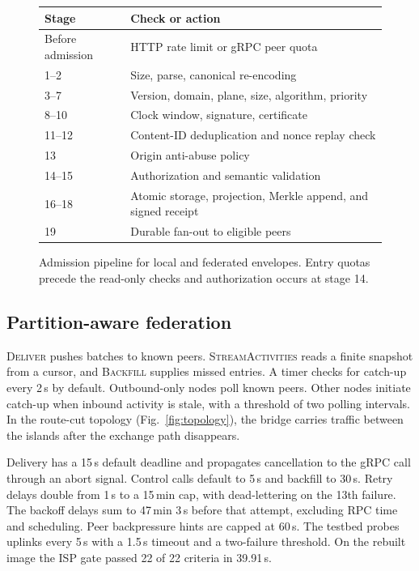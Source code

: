 \documentclass[conference,a4paper,10pt]{IEEEtran}
\begin{document}
\begin{figure}[!t]
  \centering
  {\footnotesize
  \begin{tabularx}{\columnwidth}{@{}lX@{}}
    \toprule
    \textbf{Stage} & \textbf{Check or action} \\
    \midrule
    Before admission & HTTP rate limit or gRPC peer quota \\
    \midrule
    1--2 & Size, parse, canonical re-encoding \\
    3--7 & Version, domain, plane, size, algorithm, priority \\
    8--10 & Clock window, signature, certificate \\
    11--12 & Content-ID deduplication and nonce replay check \\
    \midrule
    13 & Origin anti-abuse policy \\
    14--15 & Authorization and semantic validation \\
    16--18 & Atomic storage, projection, Merkle append, and signed receipt \\
    19 & Durable fan-out to eligible peers \\
    \bottomrule
  \end{tabularx}}
  \caption{Admission pipeline for local and federated envelopes. Entry quotas precede the read-only checks and authorization occurs at stage 14.}
  \label{fig:pipeline}
\end{figure}

\subsection{Partition-aware federation}

\textsc{Deliver} pushes batches to known peers. \textsc{StreamActivities} reads a finite snapshot from a cursor, and \textsc{Backfill} supplies missed entries. A timer checks for catch-up every 2\,s by default. Outbound-only nodes poll known peers. Other nodes initiate catch-up when inbound activity is stale, with a threshold of two polling intervals. In the route-cut topology (Fig.~\ref{fig:topology}), the bridge carries traffic between the islands after the exchange path disappears.

Delivery has a 15\,s default deadline and propagates cancellation to the gRPC call through an abort signal. Control calls default to 5\,s and backfill to 30\,s. Retry delays double from 1\,s to a 15\,min cap, with dead-lettering on the 13th failure. The backoff delays sum to 47\,min 3\,s before that attempt, excluding RPC time and scheduling. Peer backpressure hints are capped at 60\,s. The testbed probes uplinks every 5\,s with a 1.5\,s timeout and a two-failure threshold. On the rebuilt image the ISP gate passed 22 of 22 criteria in 39.91\,s.
\end{document}
